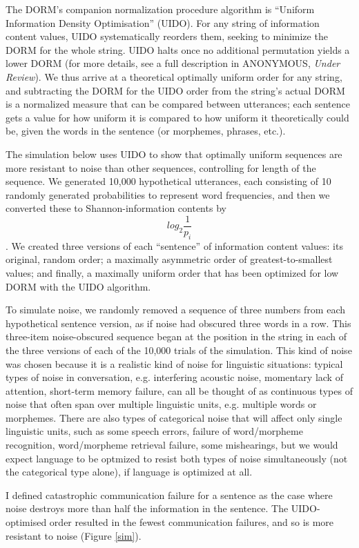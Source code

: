 \documentclass[12pt]{article}
\begin{document}
The DORM's companion normalization procedure algorithm is ``Uniform Information Density Optimisation'' (UIDO). For any string of information content values, UIDO systematically reorders them, seeking to minimize the DORM for the whole string. UIDO halts once no additional permutation yields a lower DORM (for more details, see a full description in ANONYMOUS, \textsl{Under Review}). We thus arrive at a theoretical optimally uniform order for any string, and subtracting the DORM for the UIDO order from the string's actual DORM is a normalized measure that can be compared between utterances; each sentence gets a value for how uniform it is compared to how uniform it theoretically could be, given the words in the sentence (or morphemes, phrases, etc.).

The simulation below uses UIDO to show that optimally uniform sequences are more resistant to noise than other sequences, controlling for length of the sequence. We generated 10,000 hypothetical utterances, each consisting of 10 randomly generated probabilities to represent word frequencies, and then we converted these to Shannon-information contents by $$log_2 \frac{1}{p_i}$$. We created three versions of each ``sentence'' of information content values: its original, random order; a maximally asymmetric order of greatest-to-smallest values; and finally, a maximally uniform order that has been optimized for low DORM with the UIDO algorithm.

To simulate noise, we randomly removed a sequence of three numbers from each hypothetical sentence version, as if noise had obscured three words in a row. This three-item noise-obscured sequence began at the position in the string in each of the three versions of each of the 10,000 trials of the simulation. This kind of noise was chosen because it is a realistic kind of noise for linguistic situations: typical types of noise in conversation, e.g. interfering acoustic noise, momentary lack of attention, short-term memory failure, can all be thought of as continuous types of noise that often span over multiple linguistic units, e.g. multiple words or morphemes. There are also types of categorical noise that will affect only single linguistic units, such as some speech errors, failure of word/morpheme recognition, word/morpheme retrieval failure, some mishearings, but we would expect language to be optmized to resist both types of noise simultaneously (not the categorical type alone), if language is optimized at all.

I defined catastrophic communication failure for a sentence as the case where noise destroys more than half the information in the sentence. The UIDO-optimised order resulted in the fewest communication failures, and so is more resistant to noise (Figure \ref{sim}).
\end{document}
